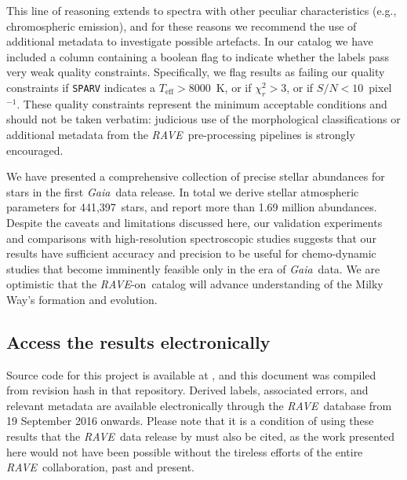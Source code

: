 \documentclass[preprint]{aastex}
\newcommand{\acronym}[1]{{\small{#1}}}
\newcommand{\project}[1]{\textsl{#1}}
\newcommand{\gaia}{\project{Gaia}}
\newcommand{\rave}{\project{\acronym{RAVE}}}
\newcommand{\raveon}{\rave-on}
\newcommand{\teff}{T_{\mathrm{eff}}}
\newcommand{\ReportedStellarParameters}{441,397} %
\begin{document}
This line of reasoning extends to spectra with other peculiar characteristics 
(e.g., chromospheric emission), and for these reasons we recommend the use of
additional metadata to investigate possible artefacts.  In our catalog we have
included a column containing a boolean flag to indicate whether the labels pass
very weak quality constraints.  Specifically, we flag results as failing our
quality constraints if \texttt{SPARV} indicates a $\teff > 8000$~K, or if 
$\chi_r^2 > 3$, or if $S/N < 10$~pixel$^{-1}$.  These quality constraints 
represent the minimum acceptable conditions and should not be taken verbatim: 
judicious use of the morphological classifications \citep{Matijevic_2012} or 
additional metadata from the \rave\ pre-processing pipelines is strongly 
encouraged.


We have presented a comprehensive collection of precise stellar abundances 
for stars in the first \gaia\ data release.  In total we derive stellar 
atmospheric parameters for \ReportedStellarParameters\ stars, and report more 
than 1.69 million abundances.  Despite the caveats and limitations discussed here, 
our validation experiments and comparisons with high-resolution spectroscopic
studies suggests that our results have sufficient accuracy and precision to
be useful for chemo-dynamic studies that become imminently feasible only in
the era of \gaia\ data.  We are optimistic that the \raveon\ catalog will 
advance understanding of the Milky Way's formation and evolution.


\subsection*{Access the results electronically}

\noindent{}Source code for this project is available at \texttt{\giturl}\hspace{-0.5em},
and this document was compiled from revision hash \texttt{\githash} in that repository.
Derived labels, associated errors, and relevant metadata are available electronically
through the \rave\ database from 19 September 2016 onwards. Please note that it is a 
condition of using these results that the \rave\ data release by \citet{Kunder_2016} 
must also be cited, as the work presented here would not have been possible without the 
tireless efforts of the entire \rave\ collaboration, past and present.
\end{document}
